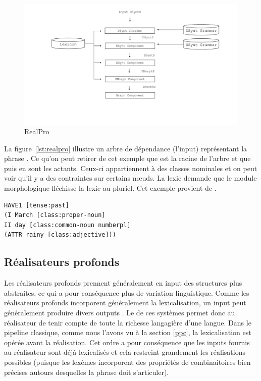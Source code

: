 \begin{figure}[htb]
	\centering
	\includegraphics[width=1\textwidth, trim = {0cm 0cm 0cm 0cm},clip]{ch2/figs/realpro.pdf}
	\caption{RealPro}
	\label{fig:RealPro}
\end{figure}

La figure~\ref{lst:realpro} illustre un arbre de dépendance (l'input) représentant la phrase . Ce qu'on peut retirer de cet exemple que  est la racine de l'arbre et que  puis  en sont les actants. Ceux-ci appartiennent à des classes nominales et on peut voir qu'il y a des contraintes sur certains n\oe{}uds. La lexie  demande que le module morphologique fléchisse la lexie au pluriel. Cet exemple provient de \cite{ReiterBuildingNaturalLanguage2000}.


\begin{lstlisting}[language=Xml, caption=Input, label=lst:realpro]
HAVE1 [tense:past]
(I March [class:proper-noun]
II day [class:common-noun numberpl]
(ATTR rainy [class:adjective]))
\end{lstlisting}


\subsection{Réalisateurs profonds}

Les réalisateurs profonds prennent généralement en input des structures plus abstraites, ce qui a pour conséquence plus de variation linguistique. Comme les réalisateurs profonds incorporent généralement la lexicalisation, un input peut généralement produire divers outputs \citep{PolguerePourmodelestratifie}. Le  de ces systèmes permet donc au réalisateur de tenir compte de toute la richesse langagière d'une langue. Dans le pipeline classique, comme nous l'avons vu à la section \ref{ppc}, la lexicalisation est opérée avant la réalisation. Cet ordre a pour conséquence que les inputs fournis au réalisateur sont déjà lexicalisés et cela restreint grandement les réalisations possibles (puisque les lexèmes incorporent des propriétés de combinaitoires bien précises autours desquelles la phrase doit s'articuler). 


